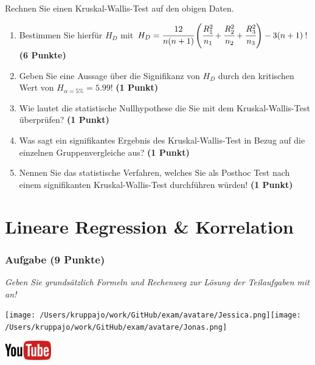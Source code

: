 \documentclass[a4paper, 9pt]{scrartcl}\usepackage[]{graphicx}\usepackage[]{xcolor}
\begin{document}
Rechnen Sie einen Kruskal-Wallis-Test auf den obigen Daten.

\begin{enumerate}
\item Bestimmen Sie hierf{\"u}r $H_D$ mit $H_D=
  \cfrac{12}{n(n+1)}\left(\cfrac{R_1^2}{n_1}+\cfrac{R_2^2}{n_2}
    + \cfrac{R_3^2}{n_3}\right)
  - 3(n+1)$! \textbf{(6 Punkte)} 
\item Geben Sie eine Aussage {\"u}ber die Signifikanz von $H_D$ durch
  den kritischen Wert von $H_{\alpha = 5\%} = 5.99$! \textbf{(1 Punkt)}
\item Wie lautet die statistische Nullhypothese die Sie mit dem Kruskal-Wallis-Test
  {\"u}berpr{\"u}fen? \textbf{(1 Punkt)}
\item Was sagt ein signifikantes Ergebnis des Kruskal-Wallis-Test in Bezug
  auf die einzelnen Gruppenvergleiche aus? \textbf{(1 Punkt)}
\item Nennen Sie das statistische Verfahren, welches Sie als Posthoc Test
  nach einem signifikanten Kruskal-Wallis-Test durchf{\"u}hren w{\"u}rden! \textbf{(1 Punkt)}
\end{enumerate} 
\clearpage
\part{Lineare Regression \& Korrelation}

\section{Aufgabe \hfill (9 Punkte)}

\textit{Geben Sie grundsätzlich Formeln und Rechenweg zur Lösung der Teilaufgaben mit an!} \\[1Ex]
 

 
\begin{minipage}[t]{0.5\textwidth}
\texttt{[image: /Users/kruppajo/work/GitHub/exam/avatare/Jessica.png]}\hspace{-4mm}\texttt{[image: /Users/kruppajo/work/GitHub/exam/avatare/Jonas.png]}
\end{minipage}
\begin{minipage}[t]{0.5\textwidth}
\hfill
\href{https://youtu.be/kHmfEmU6lrk}{\includegraphics[width = 2cm]{img/youtube}}
\end{minipage}
\vspace{1ex}
\end{document}
